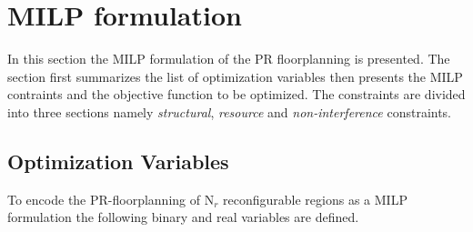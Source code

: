 

\section{MILP formulation}
In this section the MILP formulation of the PR floorplanning is presented. The section first summarizes the list of optimization variables then presents the MILP contraints and the objective function to be optimized. The constraints are divided into three sections namely \textit{structural}, \textit{resource} and \textit{non-interference} constraints.




\subsection{Optimization Variables}
To encode the PR-floorplanning of N$_r$ reconfigurable regions as a MILP formulation the following binary and real variables are defined.\\

